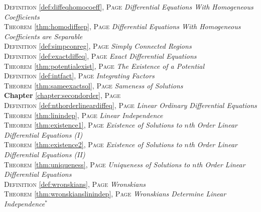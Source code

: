 \begin{multicols}{2}
{\textsc{Definition} \ref{def:diffeqhomocoeff}, \textsc{Page} \pageref{def:diffeqhomocoeff} \textit{Differential Equations With Homogeneous Coefficients} \\
\textsc{Theorem} \ref{thm:homodiffsep}, \textsc{Page} \pageref{thm:homodiffsep} \textit{Differential Equations With Homogeneous Coefficients are Separable} \\
\textsc{Definition} \ref{def:simpconreg}, \textsc{Page} \pageref{def:simpconreg} \textit{Simply Connected Regions} \\
\textsc{Definition} \ref{def:exactdiffeq}, \textsc{Page} \pageref{def:exactdiffeq} \textit{Exact Differential Equations} \\
\textsc{Theorem} \ref{thm:potentialexist}, \textsc{Page} \pageref{thm:potentialexist} \textit{The Existence of a Potential} \\
\textsc{Definition} \ref{def:intfact}, \textsc{Page} \pageref{def:intfact} \textit{Integrating Factors} \\
\textsc{Theorem} \ref{thm:sameexactsol}, \textsc{Page} \pageref{thm:sameexactsol} \textit{Sameness of Solutions} \\
\textbf{Chapter} \ref{chapter:secondorder}, \textsc{Page} \pageref{chapter:secondorder} \\
\textsc{Definition} \ref{def:nthorderlineardiffeq}, \textsc{Page} \pageref{def:nthorderlineardiffeq} \textit{Linear Ordinary Differential Equations} \\
\textsc{Theorem} \ref{thm:linindep}, \textsc{Page} \pageref{thm:linindep} \textit{Linear Independence} \\
\textsc{Theorem} \ref{thm:existence1}, \textsc{Page} \pageref{thm:existence1} \textit{Existence of Solutions to \(n\)th Order Linear Differential Equations (I)} \\
\textsc{Theorem} \ref{thm:existence2}, \textsc{Page} \pageref{thm:existence2} \textit{Existence of Solutions to \(n\)th Order Linear Differential Equations (II)} \\
\textsc{Theorem} \ref{thm:uniqueness}, \textsc{Page} \pageref{thm:uniqueness} \textit{Uniqueness of Solutions to \(n\)th Order Linear Differential Equations} \\
\textsc{Definition} \ref{def:wronskians}, \textsc{Page} \pageref{def:wronskians} \textit{Wronskians} \\
\textsc{Theorem} \ref{thm:wronskianslinindep}, \textsc{Page} \pageref{thm:wronskianslinindep} \textit{Wronskians Determine Linear Independence\(^*\)} \\
}
\end{multicols}
